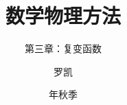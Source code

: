 \documentclass[fontset=fandol,10pt]{ctexbeamer}
\title{数学物理方法}
\subtitle{第三章：复变函数}
\author{罗凯}
\institute{南京理工大学物理学院}
\date{\zhdigits{2026}年秋季}
\begin{document}
\chaptertitleframe
\chapteroutline

\end{document}
